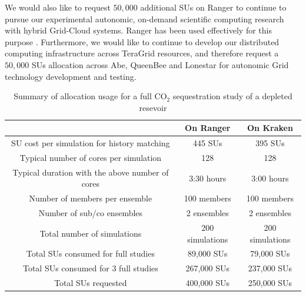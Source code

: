 \documentclass[a4paper,10pt]{article}
\newcommand{\up}{\vspace*{-1em}}
\begin{document}
We would also like to request $50,000$ additional SUs on Ranger to continue to pursue our 
experimental autonomic, on-demand scientific computing research with hybrid Grid-Cloud systems. 
Ranger has been
used effectively for this purpose \cite{Cloud1,Cloud2}. Furthermore, we would like to
continue to develop our distributed computing infrastructure across TeraGrid resources,
and therefore request a $50,000$ SUs allocation across Abe, QueenBee and Lonestar for autonomic 
Grid technology development and testing.





\up
\begin{table}[!h]
\begin{center}
 \caption{Summary of allocation usage for a full CO$_2$ sequestration study of a depleted resevoir}
\begin{tabular}{| c | c | c|}
\hline
& On Ranger & On Kraken \\
\hline
SU cost per simulation for history matching& 445 SUs & 395 SUs\\
\hline
Typical number of cores per simulation & 128 & 128 \\
\hline
Typical duration with the above number of cores & 3:30 hours & 3:00 hours \\
\hline
Number of members per ensemble & 100 members & 100 members \\ 
\hline
Number of sub/co ensembles & 2 ensembles & 2 ensembles \\ 
\hline
Total number of simulations & 200 simulations & 200 simulations\\
\hline
Total SUs consumed for full studies & 89,000 SUs & 79,000 SUs\\
\hline
Total SUs consumed for $3$ full studies & 267,000 SUs & 237,000 SUs\\
\hline
Total SUs requested & 400,000 SUs & 250,000 SUs\\
\hline
\end{tabular}
\end{center}
\up\up\up
\end{table}
\end{document}

